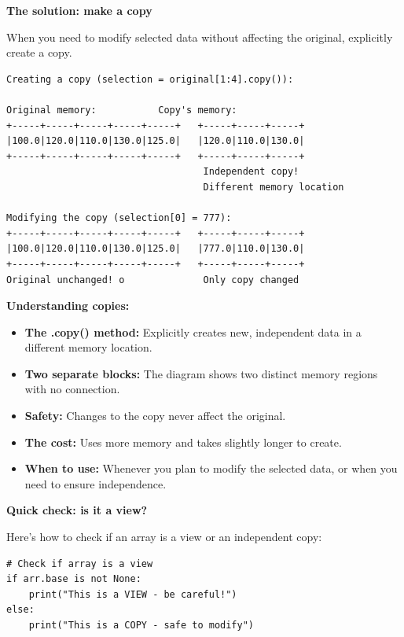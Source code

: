 \begin{tcolorbox}[
    title=Views vs copies illustrated,
    colframe=purple,
    colback = white,
    arc=2mm,
    breakable
]
\textbf{The solution: make a copy}

When you need to modify selected data without affecting the original, explicitly create a copy.

\begin{lstlisting}[basicstyle=\ttfamily\footnotesize,breaklines=true,columns=fullflexible,keepspaces=true,xleftmargin=0pt]
Creating a copy (selection = original[1:4].copy()):

Original memory:           Copy's memory:
+-----+-----+-----+-----+-----+   +-----+-----+-----+
|100.0|120.0|110.0|130.0|125.0|   |120.0|110.0|130.0|
+-----+-----+-----+-----+-----+   +-----+-----+-----+
                                   Independent copy!
                                   Different memory location

Modifying the copy (selection[0] = 777):
+-----+-----+-----+-----+-----+   +-----+-----+-----+
|100.0|120.0|110.0|130.0|125.0|   |777.0|110.0|130.0|
+-----+-----+-----+-----+-----+   +-----+-----+-----+
Original unchanged! o              Only copy changed
\end{lstlisting}
\vspace{2em}

\textbf{Understanding copies:}
\begin{itemize}
\item \textbf{The .copy() method:} Explicitly creates new, independent data in a different memory location.
\item \textbf{Two separate blocks:} The diagram shows two distinct memory regions with no connection.
\item \textbf{Safety:} Changes to the copy never affect the original.
\item \textbf{The cost:} Uses more memory and takes slightly longer to create.
\item \textbf{When to use:} Whenever you plan to modify the selected data, or when you need to ensure independence.
\end{itemize}
\vspace{2em}

\textbf{Quick check: is it a view?}

Here's how to check if an array is a view or an independent copy:

\begin{lstlisting}[basicstyle=\ttfamily\footnotesize,breaklines=true,columns=fullflexible,keepspaces=true,xleftmargin=0pt]
# Check if array is a view
if arr.base is not None:
    print("This is a VIEW - be careful!")
else:
    print("This is a COPY - safe to modify")


\end{lstlisting}
\end{tcolorbox}
